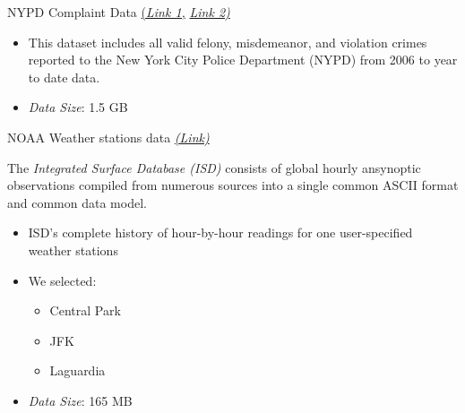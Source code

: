 \documentclass[10pt,ignorenonframetext,]{beamer}
\providecommand{\tightlist}{%
  \setlength{\itemsep}{0pt}\setlength{\parskip}{0pt}}
\begin{document}
\begin{frame}

\begin{block}{NYPD Complaint Data
\href{https://data.cityofnewyork.us/Public-Safety/NYPD-Complaint-Data-Historic/qgea-i56i}{(\emph{Link
1,}}
\href{https://data.cityofnewyork.us/Public-Safety/NYPD-Complaint-Data-Current-YTD/5uac-w243}{\emph{Link
2)}}}

\begin{itemize}
\item
  This dataset includes all valid felony, misdemeanor, and violation
  crimes reported to the New York City Police Department (NYPD) from
  2006 to year to date data.
\item
  \emph{Data Size}: 1.5 GB
\end{itemize}

\end{block}

\begin{block}{NOAA Weather stations data
\href{https://www.ncdc.noaa.gov/isd}{\emph{(Link)}}}

The \emph{Integrated Surface Database (ISD)} consists of global hourly
ansynoptic observations compiled from numerous sources into a single
common ASCII format and common data model.

\begin{itemize}
\item
  ISD’s complete history of hour-by-hour readings for one user-specified
  weather stations
\item
  We selected:

  \begin{itemize}
  \tightlist
  \item
    Central Park
  \item
    JFK
  \item
    Laguardia
  \end{itemize}
\item
  \emph{Data Size}: 165 MB
\end{itemize}

\end{block}

\end{frame}
\end{document}

